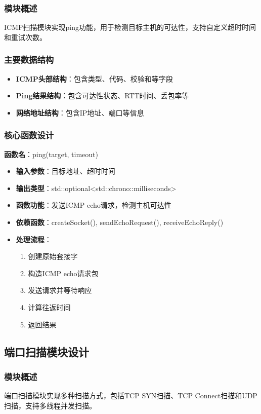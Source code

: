\documentclass[12pt,hyperref,a4paper,UTF8]{ctexart}
\begin{document}
\subsubsection{模块概述}
ICMP扫描模块实现ping功能，用于检测目标主机的可达性，支持自定义超时时间和重试次数。

\subsubsection{主要数据结构}
\begin{itemize}
    \item \textbf{ICMP头部结构}：包含类型、代码、校验和等字段
    \item \textbf{Ping结果结构}：包含可达性状态、RTT时间、丢包率等
    \item \textbf{网络地址结构}：包含IP地址、端口等信息
\end{itemize}

\subsubsection{核心函数设计}

\textbf{函数名}：ping(target, timeout)
\begin{itemize}
    \item \textbf{输入参数}：目标地址、超时时间
    \item \textbf{输出类型}：std::optional<std::chrono::milliseconds>
    \item \textbf{函数功能}：发送ICMP echo请求，检测主机可达性
    \item \textbf{依赖函数}：createSocket(), sendEchoRequest(), receiveEchoReply()
    \item \textbf{处理流程}：
    \begin{enumerate}
        \item 创建原始套接字
        \item 构造ICMP echo请求包
        \item 发送请求并等待响应
        \item 计算往返时间
        \item 返回结果
    \end{enumerate}
\end{itemize}

\subsection{端口扫描模块设计}

\subsubsection{模块概述}
端口扫描模块实现多种扫描方式，包括TCP SYN扫描、TCP Connect扫描和UDP扫描，支持多线程并发扫描。
\end{document}
